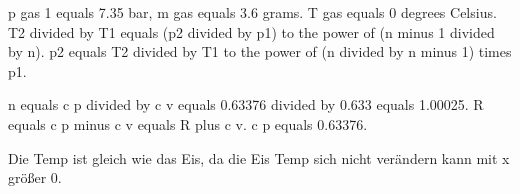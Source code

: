 p gas 1 equals 7.35 bar, m gas equals 3.6 grams.  
T gas equals 0 degrees Celsius.  
T2 divided by T1 equals (p2 divided by p1) to the power of (n minus 1 divided by n).  
p2 equals T2 divided by T1 to the power of (n divided by n minus 1) times p1.  

n equals c p divided by c v equals 0.63376 divided by 0.633 equals 1.00025.  
R equals c p minus c v equals R plus c v.  
c p equals 0.63376.  

Die Temp ist gleich wie das Eis, da die Eis Temp sich nicht verändern kann mit x größer 0.